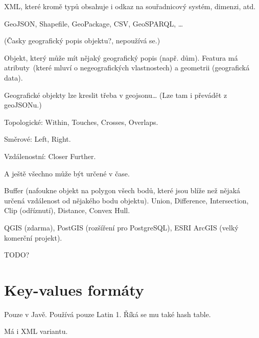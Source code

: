 \documentclass[12pt]{article}					%
\begin{document}
\begin{definice}
	XML, které kromě typů obsahuje i odkaz na souřadnicový systém, dimenzi, atd.
\end{definice}

\begin{definice}
	GeoJSON, Shapefile, GeoPackage, CSV, GeoSPARQL, …
\end{definice}

\begin{definice}[Feature]
	(Časky geografický popis objektu?, nepoužívá se.)

	Objekt, který může mít nějaký geografický popis (např. dům). Featura má atributy (které mluví o negeografických vlastnostech) a geometrii (geografická data).
\end{definice}

\begin{poznamka}
	Geografické objekty lze kreslit třeba v geojsonu… (Lze tam i převádět z geoJSONu.)
\end{poznamka}

\begin{definice}
	Topologické: Within, Touches, Crosses, Overlaps.

	Směrové: Left, Right.

	Vzdálenostní: Closer Further.

	A ještě všechno může být určené v čase.
\end{definice}

\begin{definice}
	Buffer (nafoukne objekt na polygon všech bodů, které jsou blíže než nějaká určená vzdálenost od nějakého bodu objektu). Union, Difference, Intersection, Clip (odříznutí), Distance, Convex Hull.
\end{definice}

\begin{definice}
	QGIS (zdarma), PostGIS (rozšíření pro PostgreSQL), ESRI ArcGIS (velký komerční projekt).
\end{definice}

TODO?


\section{Key-values formáty}
\begin{definice}
	Pouze v Javě. Používá pouze Latin 1. Říká se mu také hash table.

	Má i XML variantu.
\end{definice}
\end{document}
